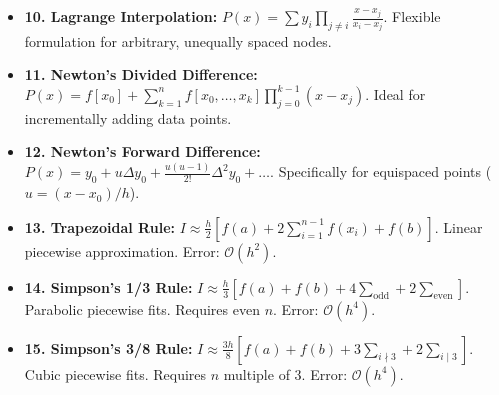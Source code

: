 \documentclass[10pt,a4paper]{report}
\begin{document}
\begin{tcolorbox}[colback=codebg,colframe=secondary,title=\textbf{Unit 3: Interpolation \& Polynomial Approximation},boxrule=1.2pt,arc=2mm]
\begin{itemize}[leftmargin=*,itemsep=4pt]
\item \textbf{10. Lagrange Interpolation:} $P(x) = \sum y_i \prod_{j \neq i} \frac{x - x_j}{x_i - x_j}$. Flexible formulation for arbitrary, unequally spaced nodes.
\item \textbf{11. Newton's Divided Difference:} $P(x) = f[x_0] + \sum_{k=1}^n f[x_0,\dots,x_k] \prod_{j=0}^{k-1} (x - x_j)$. Ideal for incrementally adding data points.
\item \textbf{12. Newton's Forward Difference:} $P(x) = y_0 + u \Delta y_0 + \frac{u(u-1)}{2!} \Delta^2 y_0 + \dots$. Specifically for equispaced points ($u = (x-x_0)/h$).
\end{itemize}
\end{tcolorbox}

\begin{tcolorbox}[colback=codebg,colframe=secondary,title=\textbf{Unit 4: Numerical Quadrature \& Integration},boxrule=1.2pt,arc=2mm]
\begin{itemize}[leftmargin=*,itemsep=4pt]
\item \textbf{13. Trapezoidal Rule:} $I \approx \frac{h}{2}[f(a) + 2\sum_{i=1}^{n-1} f(x_i) + f(b)]$. Linear piecewise approximation. Error: $\mathcal{O}(h^2)$.
\item \textbf{14. Simpson's 1/3 Rule:} $I \approx \frac{h}{3}[f(a) + f(b) + 4\sum_{\text{odd}} + 2\sum_{\text{even}}]$. Parabolic piecewise fits. Requires even $n$. Error: $\mathcal{O}(h^4)$.
\item \textbf{15. Simpson's 3/8 Rule:} $I \approx \frac{3h}{8}[f(a) + f(b) + 3\sum_{i \nmid 3} + 2\sum_{i \mid 3}]$. Cubic piecewise fits. Requires $n$ multiple of 3. Error: $\mathcal{O}(h^4)$.
\end{itemize}
\end{tcolorbox}
\end{document}

